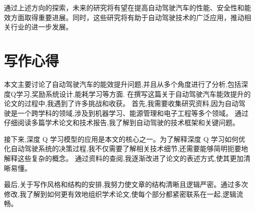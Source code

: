 \documentclass{article}
\begin{document}
通过上述方向的探索，未来的研究将有望在提高自动驾驶汽车的性能、安全性和能效方面取得重要进展。同时，这些研究将有助于自动驾驶技术的广泛应用，推动相关行业的进一步发展。

\section{写作心得}
本文主要讨论了自动驾驶汽车的能效提升问题,并且从多个角度进行了分析,包括深度Q学习,奖励系统设计,能耗学习等方面.
在撰写这篇关于自动驾驶汽车能效提升的论文的过程中,我遇到了许多挑战和收获。
首先,我需要收集研究资料,因为自动驾驶是一个跨学科的领域,涉及到机器学习、能源管理和电子工程等多个领域。
通过仔细阅读多篇学术论文和技术报告,我了解到自动驾驶的技术框架和关键问题。

接下来,深度 Q 学习模型的应用是本文的核心之一。为了解释深度 Q 学习如何优化自动驾驶系统的决策过程,我不仅需要了解相关技术细节,还需要能够简明扼要地解释这些复杂的概念。
通过资料的查阅,我逐渐改进了论文的表述方式,使其更加清晰易懂。

最后,关于写作风格和结构的安排,我努力使文章的结构清晰且逻辑严密。通过多次修改,我了解到如何更有效地组织学术论文,使每个部分都紧密联系在一起,逻辑流畅。





\end{document}
